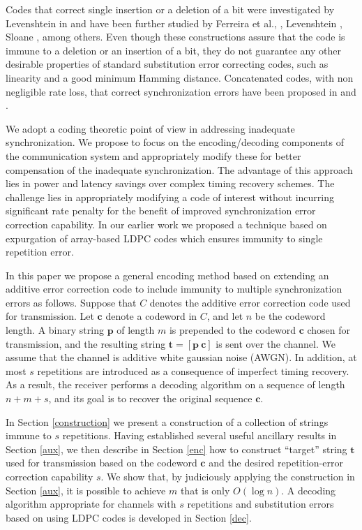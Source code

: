 Codes that correct single insertion or a deletion of a bit were
investigated by Levenshtein in \cite{lev:66} and have been further
studied by Ferreira et al., \cite{ferr:97}, Levenshtein
\cite{lev:92}, Sloane \cite{sloane:00}, among others. Even though
these constructions assure that the code is immune to a deletion
or an insertion of a bit, they do not guarantee any other
desirable properties of standard substitution error correcting
codes, such as linearity and a good minimum Hamming distance.
Concatenated codes, with non negligible rate loss, that correct
synchronization errors have been proposed in \cite{cmnv:03} and
\cite{dmackay:01}.

We adopt a coding theoretic point of view in addressing inadequate
synchronization. We propose to focus on the encoding/decoding
components of the communication system and appropriately modify
these for better compensation of the inadequate synchronization.
The advantage of this approach lies in power and latency savings
over complex timing recovery schemes. The challenge lies in
appropriately modifying a code of interest without incurring
significant rate penalty for the benefit of improved
synchronization error correction capability. In our earlier work
\cite{isit06} we proposed a technique based on expurgation of
array-based LDPC codes which ensures immunity to single repetition
error.



In this paper we propose a general encoding method based on
extending an additive error correction code to include immunity to
multiple synchronization errors as follows. Suppose that $C$
denotes the additive error correction code used for transmission.
Let $\mathbf{c}$ denote a codeword in $C$, and let $n$ be the
codeword length. A binary string $\mathbf{p}$ of length $m$ is
prepended to the codeword $\mathbf{c}$ chosen for transmission,
and the resulting string $\mathbf{t}=[\mathbf{p}~ \mathbf{c}]$ is
sent over the channel. We assume that the channel is additive
white gaussian noise (AWGN). In addition, at most $s$ repetitions
are introduced as a consequence of imperfect timing recovery. As a
result, the receiver performs a decoding algorithm on a sequence
of length $n+m+s$, and its goal is to recover the original
sequence $\mathbf{c}$.

In Section \ref{construction} we present a construction of a
collection of strings immune to $s$ repetitions. Having
established several useful ancillary results in Section \ref{aux},
we then describe in Section \ref{enc} how to construct ``target''
string $\mathbf{t}$ used for transmission based on the codeword
$\mathbf{c}$ and the desired repetition-error correction
capability $s$. We show that, by judiciously applying the
construction in Section \ref{aux}, it is possible to achieve $m$
that is only $O(\log n)$. A decoding algorithm appropriate for
channels with $s$ repetitions and substitution errors based on
using LDPC codes is developed in Section \ref{dec}.



